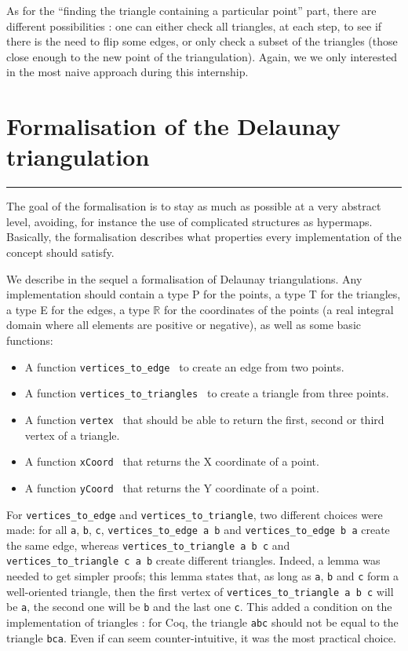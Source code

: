 \documentclass[a4paper,10pt]{article}
\def\ttt#1#2{{\tt{\color{black}#1} #2}}
\begin{document}
As for the ``finding the triangle containing a particular point'' part, there are different possibilities : one can either check all triangles, at each step, to see if there is the need to flip some edges, or only check a subset of the triangles (those close enough to the new point of the triangulation). Again, we we only interested in the most naive approach during this internship.
\section{Formalisation of the Delaunay triangulation}
\rule{\linewidth}{0.5pt}

The goal of the formalisation is to stay as much as possible at a very abstract level, avoiding, for instance the use of complicated structures as hypermaps. Basically, the formalisation describes what properties every implementation of the concept should satisfy.

We describe in the sequel a formalisation of Delaunay triangulations. Any implementation should contain a type P for the points, a type T for the triangles, a type E for the edges, a type $\mathbb{R}$ for the coordinates of the points (a real integral domain where all elements are positive or negative), as well as some basic functions:
\begin{itemize}
\item A function \ttt{vertices\_to\_edge}{} to create an edge from two points.
\item A function \ttt{vertices\_to\_triangles}{} to create a triangle from three points.
\item A function \ttt{vertex}{}  that should be able to return the first, second or third vertex of a triangle.
\item A function \ttt{xCoord}{} that returns the X coordinate of a point.
\item A function \ttt{yCoord}{} that returns the Y coordinate of a point.
\end{itemize}

For {\tt vertices\_to\_edge} and {\tt vertices\_to\_triangle}, two different choices were made:
for all {\tt a}, {\tt b}, {\tt c}, {\tt vertices\_to\_edge a b} and {\tt vertices\_to\_edge b a} create the same edge, whereas {\tt vertices\_to\_triangle a b c} and {\tt vertices\_to\_triangle c a b} create different triangles. Indeed, a lemma was needed to get simpler proofs; this lemma states that, as long as {\tt a}, {\tt b} and {\tt c} form a well-oriented triangle, then the first vertex of {\tt vertices\_to\_triangle a b c} will be {\tt a}, the second one will be {\tt b} and the last one {\tt c}. This added a condition on the implementation of triangles : for {\sc Coq}, the triangle {\tt abc} should not be equal to the triangle {\tt bca}. Even if can seem counter-intuitive, it was the most practical choice. 
\end{document}
